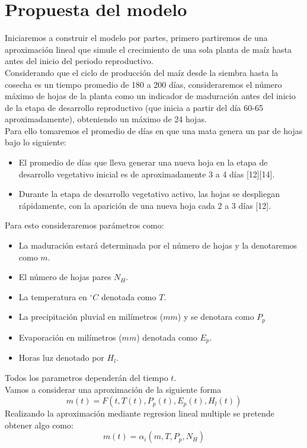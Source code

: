 \documentclass[utf8]{FrontiersinHarvard} %
\begin{document}
\section{Propuesta del modelo}
Iniciaremos a construir el modelo por partes, primero partiremos de una aproximación lineal que simule el crecimiento de una sola planta de maíz hasta antes del inicio del periodo reproductivo.
\\
Considerando que el ciclo de producción del maíz desde la siembra hasta la cosecha es un tiempo promedio de 180 a 200 días, consideraremos el número máximo de hojas de la planta como un indicador de maduración antes del inicio de la etapa de desarrollo reproductivo (que inicia a partir del día 60-65 aproximadamente), obteniendo un máximo de 24 hojas.
\\Para ello tomaremos el promedio de días en que una mata genera un par de hojas bajo lo siguiente:
\begin{itemize}
    \item El promedio de días que lleva generar una nueva hoja en la etapa de desarrollo vegetativo inicial es de aproximadamente 3 a 4 días [12][14]. 
    \item Durante la etapa de desarrollo vegetativo activo, las hojas se despliegan rápidamente, con la aparición de una nueva hoja cada 2 a 3 días [12].
    
\end{itemize}
Para esto consideraremos parámetros como:
\begin{itemize}
    \item 	La maduración estará determinada por el número de hojas y la denotaremos como $m$. 
    \item 	El número de hojas pares $N_H$.
    \item 	La temperatura en $^{\circ}C$ denotada como $T$.
    \item 	La precipitación pluvial en milímetros ($mm$) y se denotara como $P_p$ 
    \item 	Evaporación en milímetros ($mm$) denotada como $E_p$.
    \item 	Horas luz denotado por $H_l$.
\end{itemize}

Todos los parametros dependerán  del tiempo $t$.\\
Vamos a considerar una aproximación de la siguiente forma 
\begin{equation}
    m(t)= F(t,T(t),P_p(t),E_p(t),H_l(t))
    \label{eq:aproximacion}
\end{equation}
Realizando la aproximación mediante regresion lineal multiple se pretende obtener algo como:
\begin{equation}
    m(t)=\alpha_i (m,T,P_p,N_H)
    \label{eq:aproximacionRLM}
\end{equation}
\end{document}
